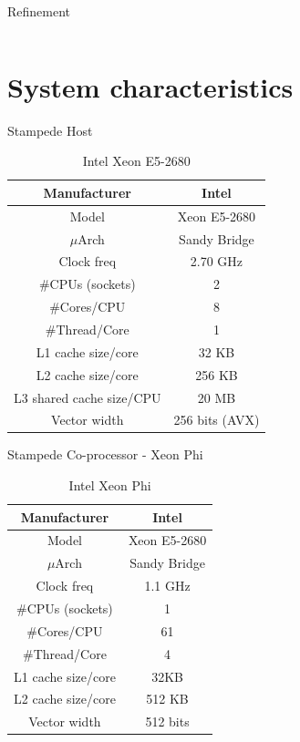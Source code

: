 \documentclass{beamer}
\begin{document}
\begin{frame}{Refinement}
\begin{columns}[c]
  \end{columns}

\end{frame}




\section{System characteristics}

\begin{frame}{Stampede Host}
\begin{table}[H]
\centering
\footnotesize
\begin{tabular}{| c | c |}\hline
Manufacturer & Intel\\ \hline
Model & Xeon E5-2680\\ \hline
$\mu$Arch & Sandy Bridge\\ \hline
Clock freq & 2.70 GHz\\ \hline
\#CPUs (sockets) & 2 \\ \hline
\#Cores/CPU & 8\\ \hline
\#Thread/Core & 1\\ \hline
L1 cache size/core & 32 KB\\ \hline
L2 cache size/core & 256 KB\\ \hline
L3 shared cache size/CPU & 20 MB\\ \hline
Vector width & 256 bits (AVX)\\ \hline
\end{tabular}
\caption{Intel Xeon E5-2680}
\end{table}
\end{frame}


\begin{frame}{Stampede Co-processor - Xeon Phi}
\begin{table}[H]
\centering
\footnotesize
\begin{tabular}{| c | c |}\hline
Manufacturer & Intel\\ \hline
Model & Xeon E5-2680\\ \hline
$\mu$Arch & Sandy Bridge\\ \hline
Clock freq & 1.1 GHz\\ \hline
\#CPUs (sockets) & 1 \\ \hline
\#Cores/CPU & 61\\ \hline
\#Thread/Core & 4\\ \hline
L1 cache size/core & 32KB\\ \hline
L2 cache size/core & 512 KB\\ \hline
Vector width & 512 bits\\ \hline
\end{tabular}
\caption{Intel Xeon Phi}
\end{table}
\end{frame}
\end{document}
